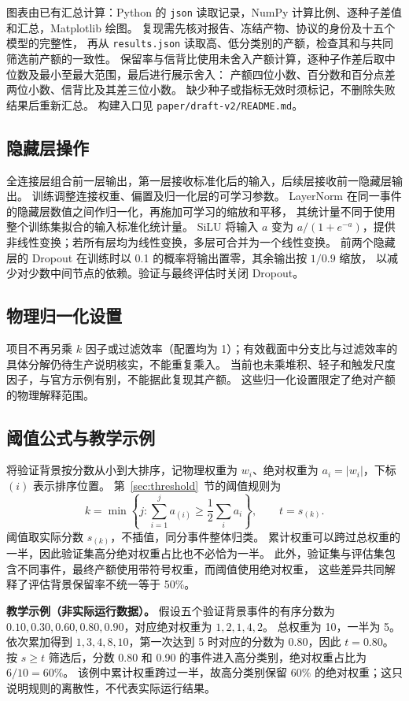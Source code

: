 \documentclass[11pt,a4paper,fontset=fandol,scheme=plain]{ctexart}
\begin{document}
图表由已有汇总计算：Python 的 \texttt{json} 读取记录，NumPy 计算比例、逐种子差值和汇总，Matplotlib 绘图。
复现需先核对报告、冻结产物、协议的身份及十五个模型的完整性，
再从 \texttt{results.json} 读取高、低分类别的产额，检查其和与共同筛选前产额的一致性。
保留率与信背比使用未舍入产额计算，逐种子作差后取中位数及最小至最大范围，最后进行展示舍入：
产额四位小数、百分数和百分点差两位小数、信背比及其差三位小数。
缺少种子或指标无效时须标记，不删除失败结果后重新汇总。
构建入口见 \nolinkurl{paper/draft-v2/README.md}。

\subsection{隐藏层操作}\label{app:layers}
全连接层组合前一层输出，第一层接收标准化后的输入，后续层接收前一隐藏层输出。
训练调整连接权重、偏置及归一化层的可学习参数。
LayerNorm 在同一事件的隐藏层数值之间作归一化，再施加可学习的缩放和平移，
其统计量不同于使用整个训练集拟合的输入标准化统计量。
SiLU 将输入 $a$ 变为 $a/(1+e^{-a})$，提供非线性变换；若所有层均为线性变换，多层可合并为一个线性变换。
前两个隐藏层的 Dropout 在训练时以 0.1 的概率将输出置零，其余输出按 $1/0.9$ 缩放，
以减少对少数中间节点的依赖。验证与最终评估时关闭 Dropout。

\subsection{物理归一化设置}\label{app:normalization}
项目不再另乘 $k$ 因子或过滤效率（配置均为 1）；有效截面中分支比与过滤效率的具体分解仍待生产说明核实，不能重复乘入。
当前也未乘堆积、轻子和触发尺度因子，与官方示例\cite{HZZAnalysis}有别，不能据此复现其产额。
这些归一化设置限定了绝对产额的物理解释范围。

\subsection{阈值公式与教学示例}
\label{app:threshold}
将验证背景按分数从小到大排序，记物理权重为 $w_i$、绝对权重为 $a_i=|w_i|$，下标 $(i)$ 表示排序位置。
第~\ref{sec:threshold}~节的阈值规则为
\[
 k=\min\left\{j:\sum_{i=1}^{j}a_{(i)}\geq\frac12\sum_i a_i\right\},
 \qquad t=s_{(k)}.
\]
阈值取实际分数 $s_{(k)}$，不插值，同分事件整体归类。
累计权重可以跨过总权重的一半，因此验证集高分绝对权重占比也不必恰为一半。
此外，验证集与评估集包含不同事件，最终产额使用带符号权重，而阈值使用绝对权重，
这些差异共同解释了评估背景保留率不统一等于 50\%。

\textbf{教学示例（非实际运行数据）。} 假设五个验证背景事件的有序分数为
$0.10,0.30,0.60,0.80,0.90$，对应绝对权重为 $1,2,1,4,2$。
总权重为 10，一半为 5。依次累加得到 $1,3,4,8,10$，第一次达到 5 时对应的分数为 0.80，因此 $t=0.80$。
按 $s\geq t$ 筛选后，分数 0.80 和 0.90 的事件进入高分类别，绝对权重占比为 $6/10=60\%$。
该例中累计权重跨过一半，故高分类别保留 60\% 的绝对权重；这只说明规则的离散性，不代表实际运行结果。
\FloatBarrier
\end{document}
